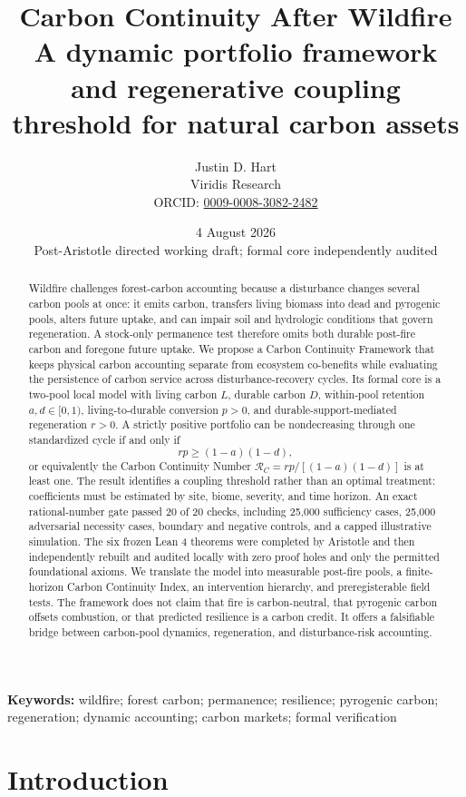 \documentclass[10pt]{article}
\title{\vspace{-1.2em}\textbf{Carbon Continuity After Wildfire}\\
\large A dynamic portfolio framework and regenerative coupling threshold for natural carbon assets}
\author{Justin D. Hart\\
\small Viridis Research\\
\small ORCID: \href{https://orcid.org/0009-0008-3082-2482}{0009-0008-3082-2482}}
\date{4 August 2026\\\small Post-Aristotle directed working draft; formal core independently audited}
\newcommand{\RC}{\mathcal{R}_{\!C}}
\begin{document}
\maketitle

\begin{abstract}
Wildfire challenges forest-carbon accounting because a disturbance changes
several carbon pools at once: it emits carbon, transfers living biomass into
dead and pyrogenic pools, alters future uptake, and can impair soil and
hydrologic conditions that govern regeneration.  A stock-only permanence test
therefore omits both durable post-fire carbon and foregone future uptake.  We
propose a Carbon Continuity Framework that keeps physical carbon accounting
separate from ecosystem co-benefits while evaluating the persistence of carbon
service across disturbance-recovery cycles.  Its formal core is a two-pool
local model with living carbon $L$, durable carbon $D$, within-pool retention
$a,d\in[0,1)$, living-to-durable conversion $p>0$, and durable-support-mediated
regeneration $r>0$.  A strictly positive portfolio can be nondecreasing through
one standardized cycle if and only if
\[
  rp\ge (1-a)(1-d),
\]
or equivalently the Carbon Continuity Number
$\RC=rp/[(1-a)(1-d)]$ is at least one.  The result identifies a coupling
threshold rather than an optimal treatment: coefficients must be estimated by
site, biome, severity, and time horizon.  An exact rational-number gate passed
20 of 20 checks, including 25,000 sufficiency cases, 25,000 adversarial
necessity cases, boundary and negative controls, and a capped illustrative
simulation.  The six frozen Lean 4 theorems were completed by Aristotle and
then independently rebuilt and audited locally with zero proof holes and only
the permitted foundational axioms.  We translate the model into measurable post-fire pools, a finite-
horizon Carbon Continuity Index, an intervention hierarchy, and preregisterable
field tests.  The framework does not claim that fire is carbon-neutral, that
pyrogenic carbon offsets combustion, or that predicted resilience is a carbon
credit.  It offers a falsifiable bridge between carbon-pool dynamics,
regeneration, and disturbance-risk accounting.
\end{abstract}

\textbf{Keywords:} wildfire; forest carbon; permanence; resilience; pyrogenic
carbon; regeneration; dynamic accounting; carbon markets; formal verification

\section{Introduction}
\end{document}

